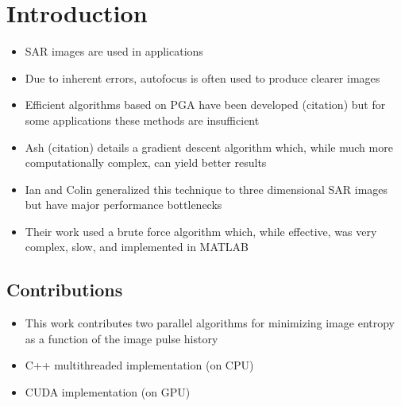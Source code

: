 \section{Introduction}\label{sec:introduction}

\begin{itemize}
  \item SAR images are used in applications
  \item Due to inherent errors, autofocus is often used to produce clearer images
  \item Efficient algorithms based on PGA have been developed (citation) but for some applications these methods are insufficient
  \item Ash (citation) details a gradient descent algorithm which, while much more computationally complex, can yield better results
  \item Ian and Colin generalized this technique to three dimensional SAR images but have major performance bottlenecks
  \item Their work used a brute force algorithm which, while effective, was very complex, slow, and implemented in MATLAB
\end{itemize}

\subsection{Contributions}

\begin{itemize}
  \item This work contributes two parallel algorithms for minimizing image entropy as a function of the image pulse history
  \item C++ multithreaded implementation (on CPU)
  \item CUDA implementation (on GPU)
\end{itemize}
